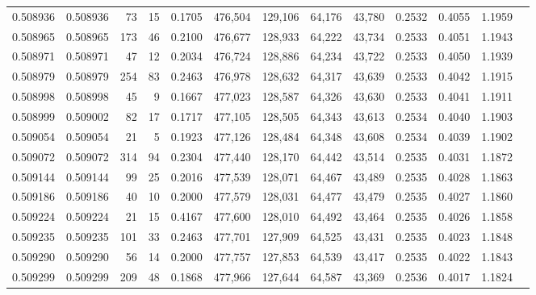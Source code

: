 \begin{tabular}{rrrrrrrrrrrrr}
0.508936 & 0.508936 &    73 &    15 &                                     0.1705 & 476,504 & 129,106 &  64,176 &  43,780 & 0.2532 & 0.4055 & 1.1959 \\
0.508965 & 0.508965 &   173 &    46 &                                     0.2100 & 476,677 & 128,933 &  64,222 &  43,734 & 0.2533 & 0.4051 & 1.1943 \\
0.508971 & 0.508971 &    47 &    12 &                                     0.2034 & 476,724 & 128,886 &  64,234 &  43,722 & 0.2533 & 0.4050 & 1.1939 \\
0.508979 & 0.508979 &   254 &    83 &                                     0.2463 & 476,978 & 128,632 &  64,317 &  43,639 & 0.2533 & 0.4042 & 1.1915 \\
0.508998 & 0.508998 &    45 &     9 &                                     0.1667 & 477,023 & 128,587 &  64,326 &  43,630 & 0.2533 & 0.4041 & 1.1911 \\
0.508999 & 0.509002 &    82 &    17 &                                     0.1717 & 477,105 & 128,505 &  64,343 &  43,613 & 0.2534 & 0.4040 & 1.1903 \\
0.509054 & 0.509054 &    21 &     5 &                                     0.1923 & 477,126 & 128,484 &  64,348 &  43,608 & 0.2534 & 0.4039 & 1.1902 \\
0.509072 & 0.509072 &   314 &    94 &                                     0.2304 & 477,440 & 128,170 &  64,442 &  43,514 & 0.2535 & 0.4031 & 1.1872 \\
0.509144 & 0.509144 &    99 &    25 &                                     0.2016 & 477,539 & 128,071 &  64,467 &  43,489 & 0.2535 & 0.4028 & 1.1863 \\
0.509186 & 0.509186 &    40 &    10 &                                     0.2000 & 477,579 & 128,031 &  64,477 &  43,479 & 0.2535 & 0.4027 & 1.1860 \\
0.509224 & 0.509224 &    21 &    15 &                                     0.4167 & 477,600 & 128,010 &  64,492 &  43,464 & 0.2535 & 0.4026 & 1.1858 \\
0.509235 & 0.509235 &   101 &    33 &                                     0.2463 & 477,701 & 127,909 &  64,525 &  43,431 & 0.2535 & 0.4023 & 1.1848 \\
0.509290 & 0.509290 &    56 &    14 &                                     0.2000 & 477,757 & 127,853 &  64,539 &  43,417 & 0.2535 & 0.4022 & 1.1843 \\
0.509299 & 0.509299 &   209 &    48 &                                     0.1868 & 477,966 & 127,644 &  64,587 &  43,369 & 0.2536 & 0.4017 & 1.1824 \\

\end{tabular}
